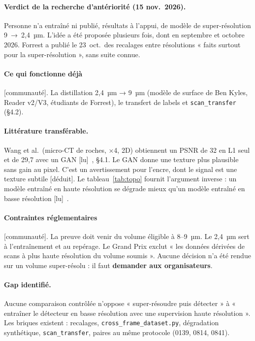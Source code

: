 \documentclass[11pt,a4paper]{article}
\newcommand{\lu}{\textsf{\small[lu]}}
\newcommand{\deduit}{\textsf{\small[déduit]}}
\newcommand{\commu}{\textsf{\small[communauté]}}
\begin{document}
\paragraph{Verdict de la recherche d'antériorité (15 nov.~2026).} Personne n'a entraîné ni
publié, résultats à l'appui, de modèle de super-résolution 9~→~2,4~µm. L'idée a été proposée
plusieurs fois, dont en septembre et octobre 2026. Forrest a publié le 23~oct.\ des recalages
entre résolutions « faits surtout pour la super-résolution », sans suite connue.

\paragraph{Ce qui fonctionne déjà} \commu. La distillation 2,4~µm → 9~µm (modèle de surface
de Ben Kyles, Reader v2/V3, étudiants de Forrest), le transfert de labels et
\texttt{scan\_transfer} (§4.2).

\paragraph{Littérature transférable.} Wang et al.\ (micro-CT de roches, ×4, 2D) obtiennent un
PSNR de 32 en L1 seul et de 29,7 avec un GAN \lu~\cite{wang2019}, §4.1. Le GAN donne une texture
plus plausible sans gain au pixel. C'est un avertissement pour l'encre, dont le signal est une
texture subtile \deduit. Le tableau~\ref{tab:topo} fournit l'argument inverse : un modèle
entraîné en haute résolution se dégrade mieux qu'un modèle entraîné en basse résolution
\lu~\cite{angelotti2026topo}.

\paragraph{Contraintes réglementaires} \commu. La preuve doit venir du volume éligible à
8–9~µm. Le 2,4~µm sert à l'entraînement et au repérage. Le Grand Prix exclut « les données
dérivées de scans à plus haute résolution du volume soumis ». Aucune décision n'a été rendue
sur un volume super-résolu : il faut \textbf{demander aux organisateurs}.

\paragraph{Gap identifié.} Aucune comparaison contrôlée n'oppose « super-résoudre puis
détecter » à « entraîner le détecteur en basse résolution avec une supervision haute
résolution ». Les briques existent : recalages, \texttt{cross\_frame\_dataset.py},
dégradation synthétique, \texttt{scan\_transfer}, paires au même protocole (0139, 0814, 0841).
\end{document}
